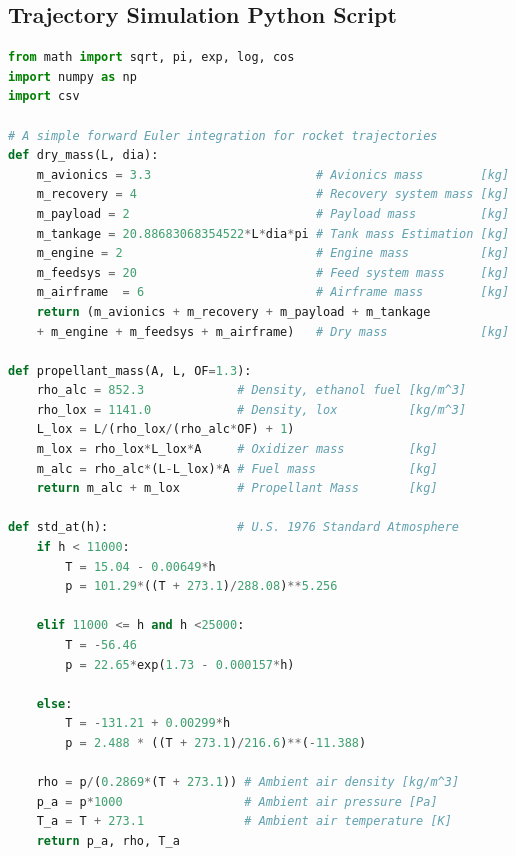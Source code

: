 \documentclass[]{aiaa-tc}%
\begin{document}
\subsection{Trajectory Simulation Python Script}
\begin{lstlisting}[language=Python]
from math import sqrt, pi, exp, log, cos
import numpy as np
import csv

# A simple forward Euler integration for rocket trajectories
def dry_mass(L, dia):
    m_avionics = 3.3                       # Avionics mass        [kg]
    m_recovery = 4                         # Recovery system mass [kg]
    m_payload = 2                          # Payload mass         [kg]
    m_tankage = 20.88683068354522*L*dia*pi # Tank mass Estimation [kg]
    m_engine = 2                           # Engine mass          [kg]
    m_feedsys = 20                         # Feed system mass     [kg]
    m_airframe  = 6                        # Airframe mass        [kg]
    return (m_avionics + m_recovery + m_payload + m_tankage 
    + m_engine + m_feedsys + m_airframe)   # Dry mass             [kg]

def propellant_mass(A, L, OF=1.3):
    rho_alc = 852.3             # Density, ethanol fuel [kg/m^3]
    rho_lox = 1141.0            # Density, lox          [kg/m^3]
    L_lox = L/(rho_lox/(rho_alc*OF) + 1)
    m_lox = rho_lox*L_lox*A     # Oxidizer mass         [kg]
    m_alc = rho_alc*(L-L_lox)*A # Fuel mass             [kg]
    return m_alc + m_lox        # Propellant Mass       [kg]

def std_at(h):                  # U.S. 1976 Standard Atmosphere
    if h < 11000:
        T = 15.04 - 0.00649*h
        p = 101.29*((T + 273.1)/288.08)**5.256

    elif 11000 <= h and h <25000:
        T = -56.46
        p = 22.65*exp(1.73 - 0.000157*h)

    else:
        T = -131.21 + 0.00299*h
        p = 2.488 * ((T + 273.1)/216.6)**(-11.388)

    rho = p/(0.2869*(T + 273.1)) # Ambient air density [kg/m^3]
    p_a = p*1000                 # Ambient air pressure [Pa]
    T_a = T + 273.1              # Ambient air temperature [K]
    return p_a, rho, T_a


\end{lstlisting}
\end{document}
